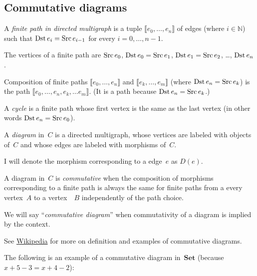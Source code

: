 \subsection{Commutative diagrams}
\begin{defn}
A \emph{finite path in directed multigraph} is a tuple $\llbracket e_{0},\ldots,e_{n}\rrbracket$
of edges (where $i\in\mathbb{N}$) such that $\operatorname{Dst} e_{i}=\operatorname{Src} e_{i-1}$
for every $i=0,\dots,n-1$.
\end{defn}

\begin{defn}
The vertices of a finite path are $\operatorname{Src} e_{0}$, $\operatorname{Dst} e_{0}=\operatorname{Src} e_{1}$,
$\operatorname{Dst} e_{1}=\operatorname{Src} e_{2}$, \ldots{}, $\operatorname{Dst} e_{n}$.
\end{defn}

\begin{defn}
Composition of finite paths $\llbracket e_{0},\ldots,e_{n}\rrbracket$
and $\llbracket e_{k},\ldots,e_{m}\rrbracket$ (where $\operatorname{Dst} e_{n}=\operatorname{Src} e_{k}$)
is the path $\llbracket e_{0},\ldots,e_{n},e_{k},\dots e_{m}\rrbracket$.
(It is a path because $\operatorname{Dst} e_{n}=\operatorname{Src} e_{k}$.)
\end{defn}

\begin{defn}
A \emph{cycle} is a finite path whose first vertex is the same as
the last vertex (in other words $\operatorname{Dst} e_{n}=\operatorname{Src} e_{0}$).
\end{defn}

\begin{defn}
A \emph{diagram} in~$C$ is a directed multigraph, whose vertices
are labeled with objects of~$C$ and whose edges are labeled with
morphisms of~$C$.

I will denote the morphism corresponding to a edge~$e$ as $D(e)$.
\end{defn}

\begin{defn}
A diagram in~$C$ is \emph{commutative} when the composition of morphisms
corresponding to a finite path is always the same for finite paths
from a every vertex~$A$ to a vertex~~$B$ independently of the
path choice.

We will say ``\emph{commutative diagram}'' when commutativity of
a diagram is implied by the context.\end{defn}
\begin{rem}
See \href{https://en.wikipedia.org/wiki/Commutative_diagram}{Wikipedia}
for more on definition and examples of commutative diagrams.
\end{rem}
The following is an example of a commutative diagram in~$\mathbf{Set}$
(because $x+5-3=x+4-2$):

